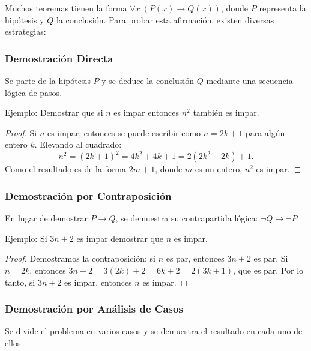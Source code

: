 Muchos teoremas tienen la forma $\forall x ~ (P(x) \to Q(x))$, donde $P$ representa la hipótesis y $Q$ la conclusión. Para probar esta afirmación, existen diversas estrategias:

\subsubsection{Demostración Directa}

Se parte de la hipótesis $P$ y se deduce la conclusión $Q$ mediante una secuencia lógica de pasos.

\begin{exampleblock}{Ejemplo: Demostrar que si $n$ es impar\text{,} entonces $n^2$ también es impar.}

\begin{proof}
    Si $n$ es impar, entonces se puede escribir como $n = 2k + 1$ para algún entero $k$. Elevando al cuadrado:
    \[
    n^2 = (2k+1)^2 = 4k^2 + 4k + 1 = 2(2k^2 + 2k) + 1.
    \]
    Como el resultado es de la forma $2m + 1$, donde $m$ es un entero, $n^2$ es impar.
\end{proof}
\end{exampleblock}

\subsubsection{Demostración por Contraposición}

En lugar de demostrar $P \to Q$, se demuestra su contrapartida lógica: $\neg Q \to \neg P$.

\begin{exampleblock}{Ejemplo: Si $3n+2$ es impar\text{,} demostrar que $n$ es impar. }

\begin{proof}
    Demostramos la contraposición: si $n$ es par, entonces $3n+2$ es par.
    Si $n = 2k$, entonces $3n+2 = 3(2k) + 2 = 6k+2 = 2(3k+1)$, que es par.
    Por lo tanto, si $3n+2$ es impar, entonces $n$ es impar.
\end{proof}
\end{exampleblock}

\subsubsection{Demostración por Análisis de Casos}

Se divide el problema en varios casos y se demuestra el resultado en cada uno de ellos.

